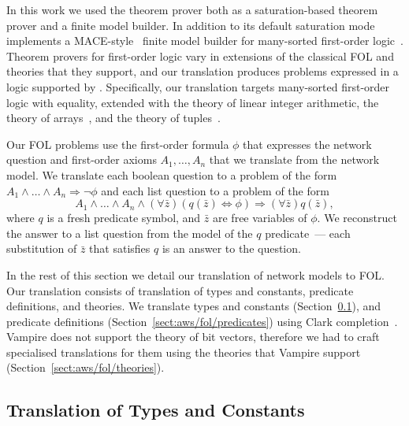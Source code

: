In this work we used the \vampire theorem prover both as a saturation-based theorem prover and a finite model builder. In addition to its default saturation mode \vampire implements a MACE-style~\cite{mccune1994davis} finite model builder for many-sorted first-order logic~\cite{VampireFMB}. Theorem provers for first-order logic vary in extensions of the classical FOL and theories that they support, and our translation produces problems expressed in a logic supported by \vampire. Specifically, our translation targets many-sorted first-order logic with equality, extended with the theory of linear integer arithmetic, the theory of arrays~\cite{VampireAndFOOL}, and the theory of tuples~\cite{KKV18}. %

Our FOL problems use the first-order formula $\phi$ that expresses the network question and first-order axioms $A_1,\ldots,A_n$ that we translate from the network model. We translate each boolean question to a problem of the form $A_1\wedge\ldots\wedge A_n \Rightarrow \neg\phi$ and each list question to a problem of the form $$A_1\wedge\ldots\wedge A_n \wedge (\forall \bar{z})(q(\bar{z})\Leftrightarrow \phi) \Rightarrow (\forall \bar{z})q(\bar{z}),$$ where $q$ is a fresh predicate symbol, and $\bar{z}$ are free variables of $\phi$. We reconstruct the answer to a list question from the model of the $q$ predicate~--- each substitution of $\bar{z}$ that satisfies $q$ is an answer to the question.

In the rest of this section we detail our translation of network models to FOL. Our translation consists of translation of types and constants, predicate definitions, and theories. We translate types and constants (Section~\ref{sect:aws/fol/types}), and predicate definitions (Section~\ref{sect:aws/fol/predicates}) using Clark completion~\cite{DBLP:conf/adbt/Clark77}. Vampire does not support the theory of bit vectors, therefore we had to craft specialised translations for them using the theories that Vampire support (Section~\ref{sect:aws/fol/theories}).

\subsection{Translation of Types and Constants}\label{sect:aws/fol/types}

